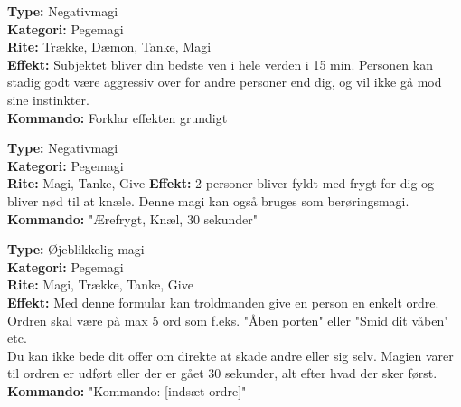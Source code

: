 \begin{kontrol*}[Venskab]
\textbf{Type:} Negativmagi\\
\textbf{Kategori:} Pegemagi\\
\textbf{Rite:} Trække, Dæmon, Tanke, Magi\\
\textbf{Effekt:} Subjektet bliver din bedste ven i hele verden i 15 min. Personen kan stadig godt være aggressiv over for andre personer end dig, og vil ikke gå mod sine instinkter.\\
\textbf{Kommando:} Forklar effekten grundigt
\end{kontrol*}

\begin{kontrol*}[Ærefrygt]
\textbf{Type:} Negativmagi\\
\textbf{Kategori:} Pegemagi\\  
\textbf{Rite:} Magi, Tanke, Give
\textbf{Effekt:} 2 personer bliver fyldt med frygt for dig og bliver nød til at knæle. Denne magi kan også bruges som berøringsmagi.\\
\textbf{Kommando:} "Ærefrygt, Knæl, 30 sekunder"
\end{kontrol*}

\begin{kontrol*}[Kommando]
\textbf{Type:} Øjeblikkelig magi\\
\textbf{Kategori:} Pegemagi\\
\textbf{Rite:} Magi, Trække, Tanke, Give\\
\textbf{Effekt:} Med denne formular kan troldmanden give en person en enkelt ordre. Ordren skal være på max 5 ord som f.eks. "Åben porten" eller "Smid dit våben" etc. \\
Du kan ikke bede dit offer om direkte at skade andre eller sig selv. Magien varer til ordren er udført eller der er gået 30 sekunder, alt efter hvad der
sker først.\\
\textbf{Kommando:} "Kommando: [indsæt ordre]"
\end{kontrol*}